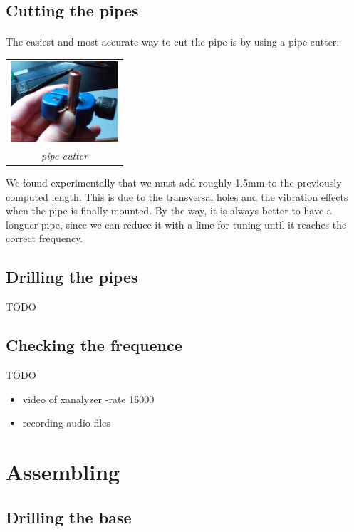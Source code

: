 \documentclass[12pt]{article}
\begin{document}
\subsection{Cutting the pipes}
\paragraph{} The easiest and most accurate way to cut the pipe is by using a pipe cutter:
\begin{center}
  \begin{tabular}{c}
    \includegraphics[keepaspectratio=true, width=40mm]{../pics/tools/pipe_cutter_scaled.jpg}
    \\
    \smallskip
    \tiny{\textit{pipe cutter}}
  \end{tabular}
\end{center}
We found experimentally that we must add roughly 1.5mm to the previously computed length.
This is due to the transversal holes and the vibration effects when the pipe is finally
mounted. By the way, it is always better to have a longuer pipe, since we can reduce it
with a lime for tuning until it reaches the correct frequency.

\subsection{Drilling the pipes}
TODO

\subsection{Checking the frequence}
TODO
\begin{itemize}
  \item video of xanalyzer -rate 16000
  \item recording audio files
\end{itemize}

\newpage
\section{Assembling}

\subsection{Drilling the base}
\end{document}
